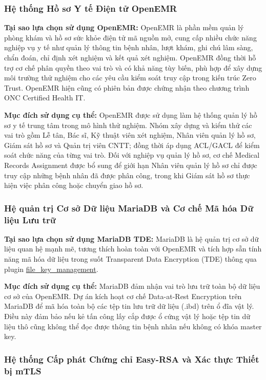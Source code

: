 \subsubsection{Hệ thống Hồ sơ Y tế Điện tử OpenEMR}

\textbf{Tại sao lựa chọn sử dụng OpenEMR:}  
OpenEMR là phần mềm quản lý phòng khám và hồ sơ sức khỏe điện tử mã nguồn mở, cung cấp nhiều chức năng nghiệp vụ y tế như quản lý thông tin bệnh nhân, lượt khám, ghi chú lâm sàng, chẩn đoán, chỉ định xét nghiệm và kết quả xét nghiệm. OpenEMR đồng thời hỗ trợ cơ chế phân quyền theo vai trò và có khả năng tùy biến, phù hợp để xây dựng môi trường thử nghiệm cho các yêu cầu kiểm soát truy cập trong kiến trúc Zero Trust. OpenEMR hiện cũng có phiên bản được chứng nhận theo chương trình ONC Certified Health IT. 

\textbf{Mục đích sử dụng cụ thể:}  
OpenEMR được sử dụng làm hệ thống quản lý hồ sơ y tế trung tâm trong mô hình thử nghiệm. Nhóm xây dựng và kiểm thử các vai trò gồm Lễ tân, Bác sĩ, Kỹ thuật viên xét nghiệm, Nhân viên quản lý hồ sơ, Giám sát hồ sơ và Quản trị viên CNTT; đồng thời áp dụng ACL/GACL để kiểm soát chức năng của từng vai trò. Đối với nghiệp vụ quản lý hồ sơ, cơ chế Medical Records Assignment được bổ sung để giới hạn Nhân viên quản lý hồ sơ chỉ được truy cập những bệnh nhân đã được phân công, trong khi Giám sát hồ sơ thực hiện việc phân công hoặc chuyển giao hồ sơ.

\subsubsection{Hệ quản trị Cơ sở Dữ liệu MariaDB và Cơ chế Mã hóa Dữ liệu Lưu trữ}

\textbf{Tại sao lựa chọn sử dụng MariaDB TDE:} MariaDB là hệ quản trị cơ sở dữ liệu quan hệ mạnh mẽ, tương thích hoàn toàn với OpenEMR và tích hợp sẵn tính năng mã hóa dữ liệu trong suốt Transparent Data Encryption (TDE) thông qua plugin \url{file_key_management}.

\textbf{Mục đích sử dụng cụ thể:} MariaDB đảm nhận vai trò lưu trữ toàn bộ dữ liệu cơ sở của OpenEMR. Dự án kích hoạt cơ chế Data-at-Rest Encryption trên MariaDB để mã hóa toàn bộ các tệp tin lưu trữ dữ liệu (.ibd) trên ổ đĩa vật lý. Điều này đảm bảo nếu kẻ tấn công lấy cắp được ổ cứng vật lý hoặc tệp tin dữ liệu thô cũng không thể đọc được thông tin bệnh nhân nếu không có khóa master key.

\subsubsection{Hệ thống Cấp phát Chứng chỉ Easy-RSA và Xác thực Thiết bị mTLS}


